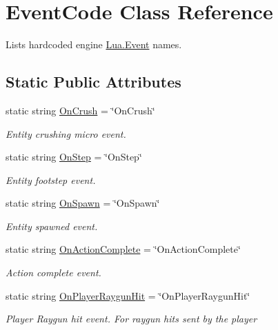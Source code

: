 \hypertarget{class_event_code}{}\section{Event\+Code Class Reference}
\label{class_event_code}


Lists hardcoded engine \mbox{\hyperlink{class_lua_1_1_event}{Lua.\+Event}} names.  


\subsection*{Static Public Attributes}
\begin{DoxyCompactItemize}
\item 
static string \mbox{\hyperlink{class_event_code_a279c4c5e28c223c4a5c590af25823780}{On\+Crush}} = \char`\"{}On\+Crush\char`\"{}
\begin{DoxyCompactList}\small\item\em Entity crushing micro event. \end{DoxyCompactList}\item 
static string \mbox{\hyperlink{class_event_code_afe7b5546673f18b5aacb38e272f8dcc0}{On\+Step}} = \char`\"{}On\+Step\char`\"{}
\begin{DoxyCompactList}\small\item\em Entity footstep event. \end{DoxyCompactList}\item 
static string \mbox{\hyperlink{class_event_code_a03a965e04c12fca8491beb8ec3753df4}{On\+Spawn}} = \char`\"{}On\+Spawn\char`\"{}
\begin{DoxyCompactList}\small\item\em Entity spawned event. \end{DoxyCompactList}\item 
static string \mbox{\hyperlink{class_event_code_a55f432be68d01cd15b1bf04936237711}{On\+Action\+Complete}} = \char`\"{}On\+Action\+Complete\char`\"{}
\begin{DoxyCompactList}\small\item\em Action complete event. \end{DoxyCompactList}\item 
static string \mbox{\hyperlink{class_event_code_aaaadd94dd51e82dc133c6e5147e2ede2}{On\+Player\+Raygun\+Hit}} = \char`\"{}On\+Player\+Raygun\+Hit\char`\"{}
\begin{DoxyCompactList}\small\item\em Player Raygun hit event. For raygun hits sent by the player \end{DoxyCompactList}\item 

\end{DoxyCompactItemize}
